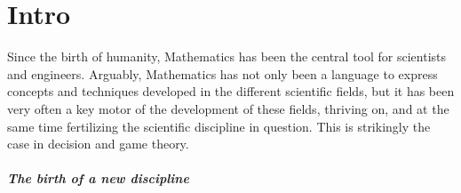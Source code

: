 \ifx \globalmark \undefined %
		
\else 
	
\fi



\chapter*{Intro}
Since the birth of humanity, Mathematics has been the central tool for scientists and engineers.  Arguably, Mathematics has not only been a language to express concepts and techniques developed in the different scientific fields, but it has been very often a key motor of the development of these fields, thriving on, and at the same time fertilizing the scientific discipline in question.  This is strikingly the case in decision and game theory.

\paragraph{The birth of a new discipline}


